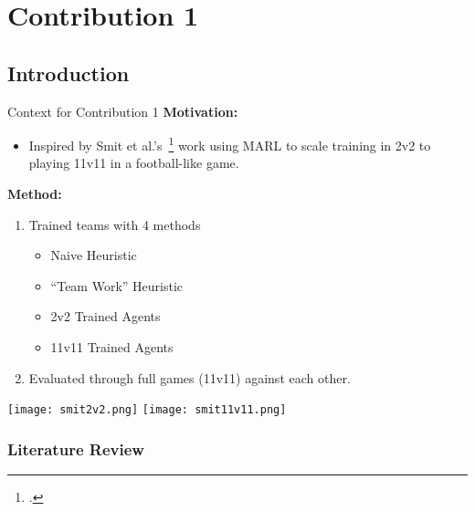 \section{Contribution 1}


\subsection{Introduction}

\begin{frame}{Context for Contribution 1}
    \textbf{Motivation:}
    \begin{itemize}
        \item Inspired by Smit et al.'s~\footcite{smit2023} 
        work using MARL to scale training in 2v2 to playing 11v11 in a football-like game.
    \end{itemize}

    \begin{multicols}{2}
        \textbf{Method:}
        \begin{enumerate}
            \item Trained teams with 4 methods
            \begin{itemize}
                \item Naive Heuristic
                \item ``Team Work'' Heuristic
                \item 2v2 Trained Agents
                \item 11v11 Trained Agents
            \end{itemize}
            \item Evaluated through full games (11v11) against each other.
        \end{enumerate}

        \vfil

        \begin{center}
            \texttt{[image: smit2v2.png]}
            \texttt{[image: smit11v11.png]}
        \end{center}
    \end{multicols}
\end{frame}

\subsubsection{Literature Review}

